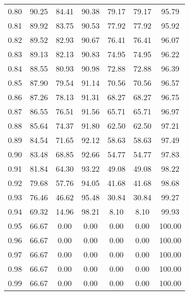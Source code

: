 \begin{tabular}{|c|c|c|c|c|c|c|}
      0.80 &     90.25 &     84.41 &      90.38 &   79.17 &      79.17 &         95.79 \\
      0.81 &     89.92 &     83.75 &      90.53 &   77.92 &      77.92 &         95.92 \\
      0.82 &     89.52 &     82.93 &      90.67 &   76.41 &      76.41 &         96.07 \\
      0.83 &     89.13 &     82.13 &      90.83 &   74.95 &      74.95 &         96.22 \\
      0.84 &     88.55 &     80.93 &      90.98 &   72.88 &      72.88 &         96.39 \\
      0.85 &     87.90 &     79.54 &      91.14 &   70.56 &      70.56 &         96.57 \\
      0.86 &     87.26 &     78.13 &      91.31 &   68.27 &      68.27 &         96.75 \\
      0.87 &     86.55 &     76.51 &      91.56 &   65.71 &      65.71 &         96.97 \\
      0.88 &     85.64 &     74.37 &      91.80 &   62.50 &      62.50 &         97.21 \\
      0.89 &     84.54 &     71.65 &      92.12 &   58.63 &      58.63 &         97.49 \\
      0.90 &     83.48 &     68.85 &      92.66 &   54.77 &      54.77 &         97.83 \\
      0.91 &     81.84 &     64.30 &      93.22 &   49.08 &      49.08 &         98.22 \\
      0.92 &     79.68 &     57.76 &      94.05 &   41.68 &      41.68 &         98.68 \\
      0.93 &     76.46 &     46.62 &      95.48 &   30.84 &      30.84 &         99.27 \\
      0.94 &     69.32 &     14.96 &      98.21 &    8.10 &       8.10 &         99.93 \\
      0.95 &     66.67 &      0.00 &       0.00 &    0.00 &       0.00 &        100.00 \\
      0.96 &     66.67 &      0.00 &       0.00 &    0.00 &       0.00 &        100.00 \\
      0.97 &     66.67 &      0.00 &       0.00 &    0.00 &       0.00 &        100.00 \\
      0.98 &     66.67 &      0.00 &       0.00 &    0.00 &       0.00 &        100.00 \\
      0.99 &     66.67 &      0.00 &       0.00 &    0.00 &       0.00 &        100.00 \\
\bottomrule
\end{tabular}
